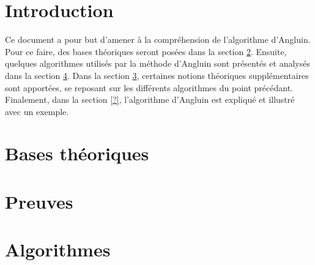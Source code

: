 

\newcommand{\student}{Benjamin André}
\newcommand{\grade}{MAB2 Sciences Informatiques}
\newcommand{\director}{Véronique Bruyère}
\renewcommand{\title}{Automates}
\renewcommand{\date}{\today}


	
	
	
	\tableofcontents
	\newpage
	
	\section{Introduction}
	Ce document a pour but d'amener à la compréhension de l'algorithme d'Angluin. Pour ce faire, des bases théoriques seront posées dans la section \ref{sec:theorie}. Ensuite, quelques algorithmes utilisés par la méthode d'Angluin sont présentés et analysés dans la section \ref{sec:algorithmes}. Dans la section \ref{sec:preuves}, certaines notions théoriques supplémentaires sont apportées, se reposant sur les différents algorithmes du point précédant. Finalement, dans la section \ref{?}, l'algorithme d'Angluin est expliqué et illustré avec un exemple.
	
	
	\section{Bases théoriques}\label{sec:theorie}
	 
	\section{Preuves}\label{sec:preuves}
	\section{Algorithmes}\label{sec:algorithmes}
	
	
	

	
	\newpage
	
	
	
